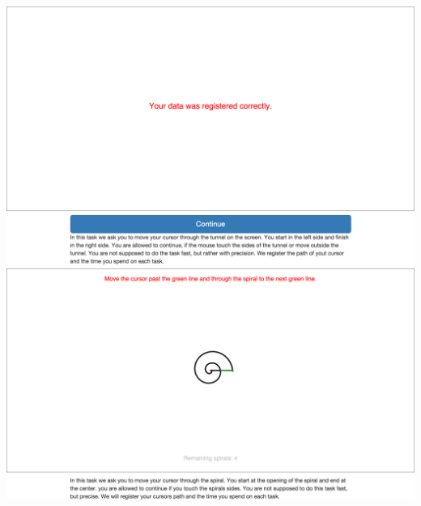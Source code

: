 \begin{appendices}
\begin{minipage}{\textwidth}
\centering
\includegraphics[width=\textwidth]{images/screenshots/ex_step_4_tunnel_done}
\label{fig:ex_step_4_tunnel_done}
\includegraphics[width=\textwidth]{images/screenshots/ex_step_5_spiral_1}
\label{fig:ex_step_5_spiral_1}
\end{minipage}


\end{appendices}
